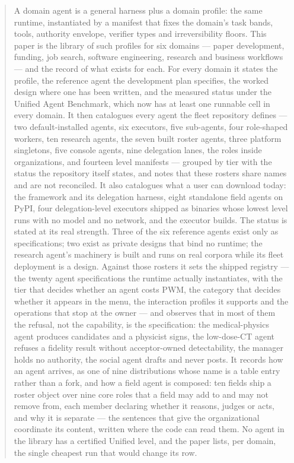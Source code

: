 \documentclass[11pt]{article}
\theoremstyle{definition}
\begin{document}
\begin{abstract}
A domain agent is a general harness plus a domain profile: the same runtime, instantiated by a manifest that fixes the domain's task bands, tools, authority envelope, verifier types and irreversibility floors. This paper is the library of such profiles for six domains --- paper development, funding, job search, software engineering, research and business workflows --- and the record of what exists for each. For every domain it states the profile, the reference agent the development plan specifies, the worked design where one has been written, and the measured status under the Unified Agent Benchmark, which now has at least one runnable cell in every domain. It then catalogues every agent the fleet repository defines --- two default-installed agents, six executors, five sub-agents, four role-shaped workers, ten research agents, the seven built roster agents, three platform singletons, five console agents, nine delegation lanes, the roles inside organizations, and fourteen level manifests --- grouped by tier with the status the repository itself states, and notes that these rosters share names and are not reconciled. It also catalogues what a user can download today: the framework and its delegation harness, eight standalone field agents on PyPI, four delegation-level executors shipped as binaries whose lowest level runs with no model and no network, and the executor builds. The status is stated at its real strength. Three of the six reference agents exist only as specifications; two exist as private designs that bind no runtime; the research agent's machinery is built and runs on real corpora while its fleet deployment is a design. Against those rosters it sets the shipped registry --- the twenty agent specifications the runtime actually instantiates, with the tier that decides whether an agent costs PWM, the category that decides whether it appears in the menu, the interaction profiles it supports and the operations that stop at the owner --- and observes that in most of them the refusal, not the capability, is the specification: the medical-physics agent produces candidates and a physicist signs, the low-dose-CT agent refuses a fidelity result without acceptor-owned detectability, the manager holds no authority, the social agent drafts and never posts. It records how an agent arrives, as one of nine distributions whose name is a table entry rather than a fork, and how a field agent is composed: ten fields ship a roster object over nine core roles that a field may add to and may not remove from, each member declaring whether it reasons, judges or acts, and why it is separate --- the sentences that give the organizational coordinate its content, written where the code can read them. No agent in the library has a certified Unified level, and the paper lists, per domain, the single cheapest run that would change its row.
\end{abstract}
\end{document}
